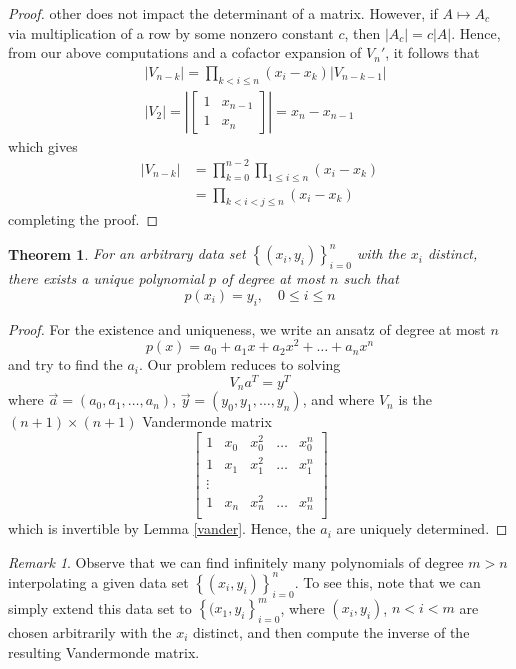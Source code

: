 \documentclass[12pt]{article}
\theoremstyle{plain}
\newtheorem{theorem}{Theorem}
\theoremstyle{definition}
\theoremstyle{remark}
\newtheorem*{remark}{Remark}
\numberwithin{equation}{section}  %
\begin{document}
\begin{proof}
		other does not impact the determinant of a matrix. However, if $A \mapsto A_c$
		via multiplication of a row by some nonzero constant $c$, then
		$|A_c| = c |A|$. Hence, from our above computations and a cofactor expansion
		of $V_n'$, it follows that 
		\begin{align*}
			& |V_{n-k}| = \prod_{k < i \le n} (x_i - x_k) |V_{n-k-1}|\\
			& | V_2 | = \left |
			\begin{bmatrix}
				1 & x_{n-1} \\
				1 & x_{n}
			\end{bmatrix}
			\right | = x_n - x_{n-1}
		\end{align*}
		which gives
		\begin{align*}
			|V_{n-k}| & = \prod_{k=0}^{n-2} \prod_{1 \le i \le n} (x_i - x_k)\\
			& = \prod_{k < i < j \le n} (x_i - x_k)
		\end{align*}
		completing the proof.
	\end{proof}
	\begin{theorem}
		For an arbitrary data set $ \left\{ (x_i, y_i) \right\}_{i = 0}^{n}$ with the $x_i$
		distinct, there
		exists a unique polynomial $p$ of degree at most $n$ such that
		\begin{equation*}
			p(x_i) = y_i, \quad 0 \le i \le n
		\end{equation*}
	\end{theorem}
	\begin{proof}
		For the existence and uniqueness, we write an ansatz of degree at most $n$
		\begin{equation*}
			p(x) = a_0 + a_1x + a_2x^2 + \ldots + a_nx^n
		\end{equation*}
		and try to find the $a_i$. 
		Our problem reduces to solving
		\begin{equation*}
			V_n a^{T} = y^{T}
		\end{equation*}
		where $\vec{a} = (a_0, a_1, \ldots, a_n)$, $\vec{y} = (y_0, y_1, \ldots, y_n)$,
		and where $V_n$ is the $(n+1) \times (n+1)$ Vandermonde matrix
		\begin{equation*}
			\begin{bmatrix}
				1 & x_0 & x_0^{2} & \ldots & x_0^{n} \\
				1 & x_1 & x_1^{2} & \ldots & x_1^{n} \\
				\vdots \\
				1 & x_n & x_n^{2} & \ldots & x_n^{n} \\
			\end{bmatrix}
		\end{equation*}
		which is invertible by Lemma \ref{vander}. Hence, the $a_i$ are uniquely determined.
	\end{proof}
	\begin{remark}
		Observe that we can find infinitely many polynomials of degree $m > n$
		interpolating a given data set $\left\{ (x_i, y_i) \right\}_{i=0}^n$. To see
		this, note that we can simply extend this data set to $ \left\{ (x_1, y_i
			\right\}_{i=0}^m$, where $(x_i, y_i)$, $n < i < m$ are chosen arbitrarily with
			the $x_i$ distinct, and then compute the inverse of the resulting Vandermonde
			matrix.
		\end{remark}
\end{document}
